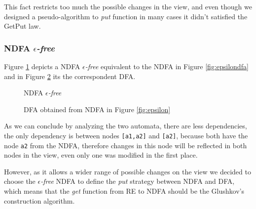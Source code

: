This fact restricts too much the possible changes in the view, and even though we designed a pseudo-algorithm to \textit{put} function in many cases it didn't satisfied the GetPut law. 

\subsubsection{NDFA \textit{$\epsilon$-free}} Figure \ref{fig:glundfa} depicts a NDFA \textit{$\epsilon$-free} equivalent to the NDFA in Figure \ref{fig:epsilondfa} and in Figure \ref{fig:gludfa} its the correspondent DFA. 

\begin{figure}[H]
    \centering
    \caption{NDFA \textit{$\epsilon$-free}}
    \label{fig:glundfa}
\end{figure}

\begin{figure}
    \centering
    \caption{DFA obtained from NDFA in Figure \ref{fig:epsilon}}
    \label{fig:gludfa}
\end{figure}

As we can conclude by analyzing the two automata, there are less dependencies, the only dependency is between nodes \texttt{[a1,a2]} and \texttt{[a2]}, because both have the node \texttt{a2} from the NDFA, therefore changes in this node will be reflected in both nodes in the view, even only one was modified in the first place. 

However, as it allows a wider range of possible changes on the view we decided to choose the \textit{$\epsilon$-free} NDFA to define the \textit{put} strategy between NDFA and DFA, which means that the \textit{get} function from RE to NDFA should be the Glushkov's construction algorithm. 


